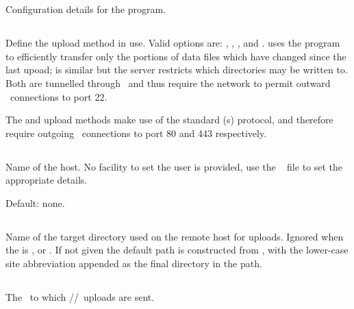 \section{\code{[upload]}}
Configuration details for the  program.

\subsection{}
Define the upload method in use. Valid options are: ,
, , and .  uses the
 program to efficiently transfer only the portions of
data files which have changed since the last upoad;  is
similar but the server restricts which directories may be written
to. Both are tunnelled through \ssh\ and thus require the network to
permit outward \tcp\ connections to port 22.

The  and  upload methods make use of the standard
\http(s) protocol, and therefore require outgoing \tcp\ connections to
port 80 and 443 respectively. 

\subsection{}
Name of the  host. No facility to set the user is
provided, use the \ssh\  file to set the
appropriate details.

Default: none.


\subsection{}
Name of the target directory used on the remote host for 
uploads. Ignored when the  is , 
or . If not given the default path is constructed from
, with the lower-case site
abbreviation appended as the final directory in the path.

\subsection{}
The \URL\ to which \http/\slash \https\ uploads are sent.

